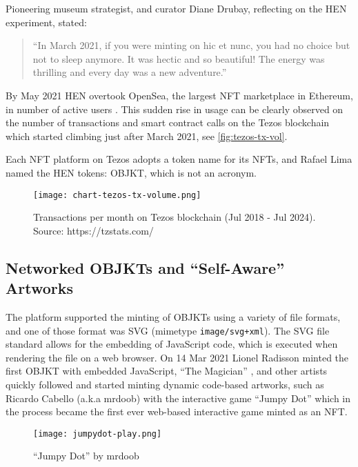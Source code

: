 Pioneering museum strategist, and curator Diane Drubay, reflecting on the HEN experiment, stated:

\begin{quotation}
``In March 2021, if you were minting on hic et nunc, you had no choice but not to sleep anymore. It was hectic and so beautiful! The energy was thrilling and every day was a new adventure.'' \cite{drubayHowHicNunc2021}
\end{quotation}



By May 2021 HEN overtook OpenSea, the largest NFT marketplace in Ethereum, in number of active users \cite{nelsonWhereAreYour2022}. This sudden rise in usage can be clearly observed on the number of transactions and smart contract calls on the Tezos blockchain which started climbing just after March 2021, see \autoref{fig:tezos-tx-vol}.

Each NFT platform on Tezos adopts a token name for its NFTs, and Rafael Lima named the HEN tokens: \gls{OBJKT}, which is not an acronym.


\begin{figure}[h]
    \centering
    \texttt{[image: chart-tezos-tx-volume.png]}
    \caption[Transactions per month on Tezos blockchain]{Transactions per month on Tezos blockchain (Jul 2018 - Jul 2024). Source: https://tzstats.com/}
    \label{fig:tezos-tx-vol}
\end{figure}


\subsection*{Networked OBJKTs and ``Self-Aware'' Artworks}

The platform supported the minting of OBJKTs using a variety of file formats, and one of those format was SVG (mimetype \texttt{image/svg+xml}). The SVG file standard allows for the embedding of JavaScript code, which is executed when rendering the file on a web browser.  On 14 Mar 2021 Lionel Radisson minted the first OBJKT with embedded JavaScript, ``The Magician''  \cite{makio135Magician2021}, and other artists quickly followed and started minting dynamic code-based artworks, such as Ricardo Cabello (a.k.a mrdoob)  with the interactive game ``Jumpy Dot'' \needcite which in the process became the first ever web-based interactive game minted as an NFT.

\begin{figure}[H]
    \centering
    \texttt{[image: jumpydot-play.png]}
    \caption[``Jumpy Dot'' by mrdoob]{``Jumpy Dot'' by mrdoob}
    \label{fig:jumpydot}
\end{figure}


